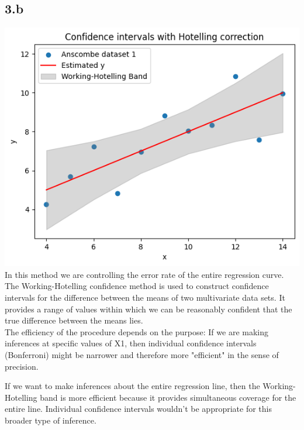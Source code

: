 \documentclass[12pt]{article}
\begin{document}
\subsection*{3.b}
\includegraphics*[width=\linewidth]{graph3b}
In this method we are controlling the error rate of the entire regression curve.
\\
The Working-Hotelling confidence method is used to construct confidence
intervals for the difference between the means of two multivariate data sets.
It provides a range of values within which we can be reasonably confident that
the true difference between the means lies.
\\[\baselineskip]
The efficiency of the procedure depends on the purpose:
If we are making inferences at specific values of X1,
then individual confidence intervals (Bonferroni)
might be narrower and therefore more "efficient" in the sense of precision.

If we want to make inferences about the entire regression line,
then the Working-Hotelling band is more efficient because it provides
simultaneous coverage for the entire line.
Individual confidence intervals wouldn't be appropriate for this broader
type of inference.

\newpage
\end{document}
